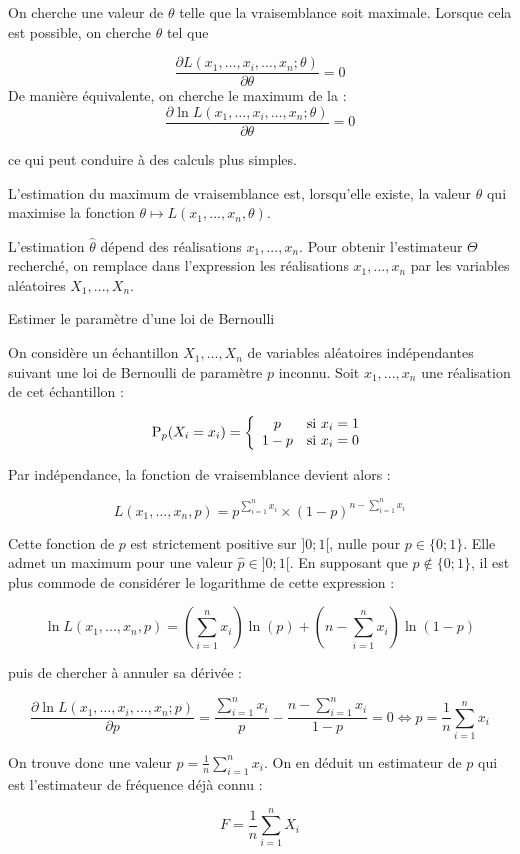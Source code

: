 On cherche une valeur de $\theta$ telle que la vraisemblance soit maximale. Lorsque cela est possible, on cherche $\theta$ tel que 

$${\frac {\partial L(x_{1},\ldots ,x_{i},\ldots ,x_{n};\theta )}{\partial \theta }}=0 $$
De manière équivalente, on cherche le maximum de la  :
$${\frac {\partial \ln L(x_{1},\ldots ,x_{i},\ldots ,x_{n};\theta )}{\partial \theta }}=0 $$

ce qui peut conduire à des calculs plus simples. 

\begin{definition}{}{}
	L'estimation du maximum de vraisemblance est, lorsqu'elle existe, la valeur $\hat{\theta}$ qui maximise la fonction $\theta \mapsto L(x_1,...,x_n, \theta)$. 
\end{definition}

L'estimation $\hat{\theta}$ dépend des réalisations $x_1,...,x_n$. Pour obtenir l'estimateur $\Theta$ recherché, on remplace dans l'expression les réalisations $x_1,...,x_n$ par les variables aléatoires $X_1,...,X_n$.
\begin{exemple}{Estimer le paramètre d'une loi de Bernoulli}{}

On considère un échantillon $X_1,...,X_n$ de variables aléatoires indépendantes suivant une loi de Bernoulli de paramètre $p$ inconnu. Soit $x_1,...,x_n$ une réalisation de cet échantillon :

$$\operatorname{P}_p(X_i=x_i)=\left\{\begin{array}{cl}
p&\text{si $x_i = 1$}\\
1-p &\text{si $x_i = 0$}
\end{array}\right.$$

Par indépendance, la fonction de vraisemblance devient alors :

$$L(x_1,...,x_n, p) = p^{\sum_{i=1}^n x_i} \times \left(1-p\right)^{n-\sum_{i=1}^n x_i}$$

Cette fonction de $p$ est strictement positive sur $]0;1[$, nulle pour $p \in \{0;1\}$. Elle admet un maximum pour une valeur $\hat{p} \in ]0;1[$. En supposant que $p \notin \{0;1\}$, il est plus commode de considérer le logarithme de cette expression :

$$\ln L(x_1,...,x_n, p) = \left(\sum_{i=1}^n x_i \right) \ln(p) + \left(n-\sum_{i=1}^n x_i \right) \ln(1-p)$$

puis de chercher à annuler sa dérivée :

$$\frac {\partial \ln L(x_{1},\ldots ,x_{i},\ldots ,x_{n};p )}{\partial p } = \frac{\sum_{i=1}^n x_i}{p} - \frac{n - \sum_{i=1}^n x_i}{1-p} = 0 \iff p = \frac{1}{n } \sum_{i=1}^n x_i$$

On trouve donc une valeur $\hat{p} = \frac{1}{n } \sum_{i=1}^n x_i$. On en déduit un estimateur de $p$ qui est l'estimateur de fréquence déjà connu :

$$F = \frac{1}{n } \sum_{i=1}^n X_i$$

\end{exemple}
